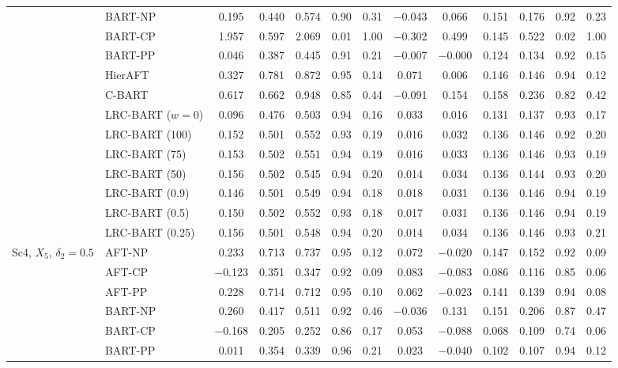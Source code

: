 \documentclass[11pt]{article}
\theoremstyle{definition}
\theoremstyle{plain}
\begin{document}
\begin{center}
\begin{longtable}{llccccccccccc}
& BART-NP & 0.195 & 0.440 & 0.574 & 0.90 & 0.31 & $-$0.043 & 0.066 & 0.151 & 0.176 & 0.92 & 0.23 \\
& BART-CP & 1.957 & 0.597 & 2.069 & 0.01 & 1.00 & $-$0.302 & 0.499 & 0.145 & 0.522 & 0.02 & 1.00 \\
& BART-PP & 0.046 & 0.387 & 0.445 & 0.91 & 0.21 & $-$0.007 & $-$0.000 & 0.124 & 0.134 & 0.92 & 0.15 \\
& HierAFT & 0.327 & 0.781 & 0.872 & 0.95 & 0.14 & 0.071 & 0.006 & 0.146 & 0.146 & 0.94 & 0.12 \\
& C-BART & 0.617 & 0.662 & 0.948 & 0.85 & 0.44 & $-$0.091 & 0.154 & 0.158 & 0.236 & 0.82 & 0.42 \\
& LRC-BART ($w=0$) & 0.096 & 0.476 & 0.503 & 0.94 & 0.16 & 0.033 & 0.016 & 0.131 & 0.137 & 0.93 & 0.17 \\
& LRC-BART (100) & 0.152 & 0.501 & 0.552 & 0.93 & 0.19 & 0.016 & 0.032 & 0.136 & 0.146 & 0.92 & 0.20 \\
& LRC-BART (75) & 0.153 & 0.502 & 0.551 & 0.94 & 0.19 & 0.016 & 0.033 & 0.136 & 0.146 & 0.93 & 0.19 \\
& LRC-BART (50) & 0.156 & 0.502 & 0.545 & 0.94 & 0.20 & 0.014 & 0.034 & 0.136 & 0.144 & 0.93 & 0.20 \\
& LRC-BART (0.9) & 0.146 & 0.501 & 0.549 & 0.94 & 0.18 & 0.018 & 0.031 & 0.136 & 0.146 & 0.94 & 0.19 \\
& LRC-BART (0.5) & 0.150 & 0.502 & 0.552 & 0.93 & 0.18 & 0.017 & 0.031 & 0.136 & 0.146 & 0.94 & 0.19 \\
& LRC-BART (0.25) & 0.156 & 0.501 & 0.548 & 0.94 & 0.20 & 0.014 & 0.034 & 0.136 & 0.146 & 0.93 & 0.21 \\
\midrule
\multirow{15}{*}{Sc4, $X_5$, $\delta_2=0.5$} & AFT-NP & 0.233 & 0.713 & 0.737 & 0.95 & 0.12 & 0.072 & $-$0.020 & 0.147 & 0.152 & 0.92 & 0.09 \\
& AFT-CP & $-$0.123 & 0.351 & 0.347 & 0.92 & 0.09 & 0.083 & $-$0.083 & 0.086 & 0.116 & 0.85 & 0.06 \\
& AFT-PP & 0.228 & 0.714 & 0.712 & 0.95 & 0.10 & 0.062 & $-$0.023 & 0.141 & 0.139 & 0.94 & 0.08 \\
& BART-NP & 0.260 & 0.417 & 0.511 & 0.92 & 0.46 & $-$0.036 & 0.131 & 0.151 & 0.206 & 0.87 & 0.47 \\
& BART-CP & $-$0.168 & 0.205 & 0.252 & 0.86 & 0.17 & 0.053 & $-$0.088 & 0.068 & 0.109 & 0.74 & 0.06 \\
& BART-PP & 0.011 & 0.354 & 0.339 & 0.96 & 0.21 & 0.023 & $-$0.040 & 0.102 & 0.107 & 0.94 & 0.12 \\

\end{longtable}
\end{center}
\end{document}
